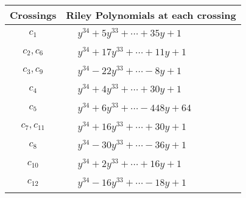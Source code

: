 \documentclass[1p]{elsarticle_modified}
\theoremstyle{definition}
\begin{document}
\begin{tabular}{m{50pt}|m{274pt}}
Crossings & \hspace{64pt}Riley Polynomials at each crossing \\
\hline $$\begin{aligned}c_{1}\end{aligned}$$&$\begin{aligned}
&y^{34}+5 y^{33}+\cdots+35 y+1
\end{aligned}$\\
\hline $$\begin{aligned}c_{2},c_{6}\end{aligned}$$&$\begin{aligned}
&y^{34}+17 y^{33}+\cdots+11 y+1
\end{aligned}$\\
\hline $$\begin{aligned}c_{3},c_{9}\end{aligned}$$&$\begin{aligned}
&y^{34}-22 y^{33}+\cdots-8 y+1
\end{aligned}$\\
\hline $$\begin{aligned}c_{4}\end{aligned}$$&$\begin{aligned}
&y^{34}+4 y^{33}+\cdots+30 y+1
\end{aligned}$\\
\hline $$\begin{aligned}c_{5}\end{aligned}$$&$\begin{aligned}
&y^{34}+6 y^{33}+\cdots-448 y+64
\end{aligned}$\\
\hline $$\begin{aligned}c_{7},c_{11}\end{aligned}$$&$\begin{aligned}
&y^{34}+16 y^{33}+\cdots+30 y+1
\end{aligned}$\\
\hline $$\begin{aligned}c_{8}\end{aligned}$$&$\begin{aligned}
&y^{34}-30 y^{33}+\cdots-36 y+1
\end{aligned}$\\
\hline $$\begin{aligned}c_{10}\end{aligned}$$&$\begin{aligned}
&y^{34}+2 y^{33}+\cdots+16 y+1
\end{aligned}$\\
\hline $$\begin{aligned}c_{12}\end{aligned}$$&$\begin{aligned}
&y^{34}-16 y^{33}+\cdots-18 y+1
\end{aligned}$\\
\hline
\end{tabular}\\~\\
\end{document}
